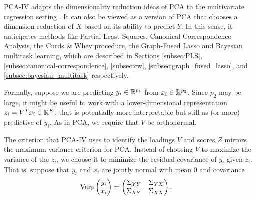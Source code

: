 \documentclass[14pt]{extarticle}
\begin{document}
PCA-IV adapts the dimensionality reduction ideas of PCA to the multivariate
regression setting \citep{rao1964use}. It can also be viewed as a version of PCA
that chooses a dimension reduction of $X$ based on its ability to predict $Y$.
In this sense, it anticipates methods like Partial Least Squares, Canonical
Correspondence Analysis, the Curds \& Whey procedure, the Graph-Fused Lasso and
Bayesian multitask learning, which are described in Sections \ref{subsec:PLS},
\ref{subsec:canonical-correspondence}, \ref{subsec:cw},
\ref{subsec:graph_fused_lasso}, and \ref{subsec:bayesian_multitask}
respectively.

Formally, suppose we are predicting $y_{i} \in \mathbb{R}^{p_{1}}$ from $x_{i} \in
\mathbb{R}^{p_{2}}$. Since $p_{2}$ may be large, it might be useful to work with a
lower-dimensional representation $z_{i} = V^{T}x_{i} \in \mathbb{R}^{K}$, that is
potentially more interpretable but still as (or more) predictive of $y_{i}$. As
in PCA, we require that $V$ be orthonormal.

The criterion that PCA-IV uses to identify the loadings $V$ and scores $Z$
mirrors the maximum variance criterion for PCA. Instead of choosing $V$ to
maximize the variance of the $z_{i}$, we choose it to minimize the residual
covariance of $y_{i}$ given $z_{i}$. That is, suppose that $y_{i}$ and $x_{i}$
are jointly normal with mean 0 and covariance
\begin{align*}
\mathrm{Var}_{\mathbb{P}}\begin{pmatrix}y_{i} \\ x_{i}\end{pmatrix} &=
\begin{pmatrix}
  \Sigma_{YY} & \Sigma_{YX} \\
  \Sigma_{XY} & \Sigma_{XX}
\end{pmatrix}.
\end{align*}
\end{document}
